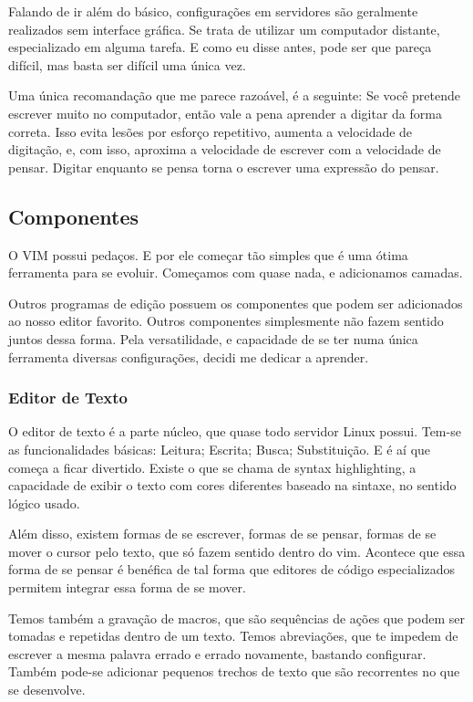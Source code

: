 \documentclass[a4paper, 12pt]{article}
\begin{document}
Falando de ir além do básico, configurações em servidores são geralmente realizados sem interface gráfica.
Se trata de utilizar um computador distante, especializado em alguma tarefa.
E como eu disse antes, pode ser que pareça difícil, mas basta ser difícil uma única vez.

Uma única recomandação que me parece razoável, é a seguinte: Se você pretende escrever muito no computador, então vale a pena
aprender a digitar da forma correta.
Isso evita lesões por esforço repetitivo, aumenta a velocidade de digitação,
e, com isso, aproxima a velocidade de escrever com a velocidade de pensar.
Digitar enquanto se pensa torna o escrever uma expressão do pensar.

\subsection{Componentes}
O VIM possui pedaços.
E por ele começar tão simples que é uma ótima ferramenta para se evoluir.
Começamos com quase nada, e adicionamos camadas.

Outros programas de edição possuem os componentes que podem ser adicionados ao nosso editor favorito.
Outros componentes simplesmente não fazem sentido juntos dessa forma.
Pela versatilidade, e capacidade de se ter numa única ferramenta diversas configurações, decidi me dedicar a aprender.

\subsubsection{Editor de Texto}
O editor de texto é a parte núcleo, que quase todo servidor Linux possui.
Tem-se as funcionalidades básicas: Leitura; Escrita; Busca; Substituição.
E é aí que começa a ficar divertido.
Existe o que se chama de syntax highlighting, a capacidade de exibir o texto
com cores diferentes baseado na sintaxe, no sentido lógico usado.

Além disso, existem formas de se escrever, formas de se pensar, formas de se
mover o cursor pelo texto, que só fazem sentido dentro do vim.
Acontece que essa forma de se pensar é benéfica de tal forma que
editores de código especializados permitem integrar essa forma de se mover.

Temos também a gravação de macros, que são sequências de ações que podem ser tomadas e repetidas dentro de um texto.
Temos abreviações, que te impedem de escrever a mesma palavra errado e errado novamente, bastando configurar.
Também pode-se adicionar pequenos trechos de texto que são recorrentes no que se desenvolve.
\end{document}
